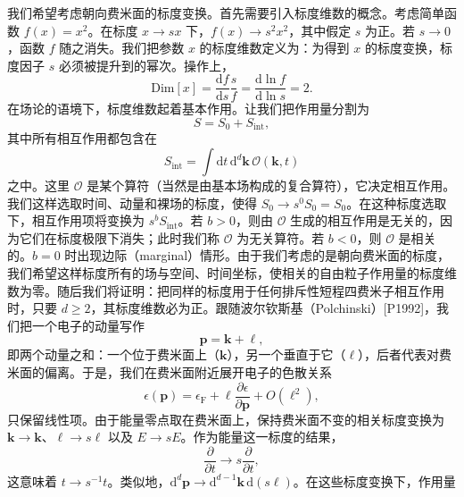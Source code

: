 我们希望考虑朝向费米面的标度变换。首先需要引入标度维数的概念。考虑简单函数 $f(x)=x^2$。在标度 $x\to sx$ 下，$f(x)\to s^2x^2$，其中假定 $s$ 为正。若 $s\to 0$，函数 $f$ 随之消失。我们把参数 $x$ 的标度维数定义为：为得到 $x$ 的标度变换，标度因子 $s$ 必须被提升到的幂次。操作上，
\begin{equation*}
\mathrm{Dim}[x]=\frac{\mathrm d f}{\mathrm d s}\frac{s}{f}=\frac{\mathrm d\ln f}{\mathrm d\ln s}=2. \tag{12.93}
\end{equation*}
在场论的语境下，标度维数起着基本作用。让我们把作用量分割为
\begin{equation*}
S=S_0+S_{\mathrm{int}}, \tag{12.94}
\end{equation*}
其中所有相互作用都包含在
\begin{equation*}
S_{\mathrm{int}}=\int\mathrm d t\,\mathrm d^d\mathbf k\,\mathcal O(\mathbf k,t) \tag{12.95}
\end{equation*}
之中。这里 $\mathcal O$ 是某个算符（当然是由基本场构成的复合算符），它决定相互作用。我们这样选取时间、动量和裸场的标度，使得 $S_0\to s^0S_0=S_0$。在这种标度选取下，相互作用项将变换为 $s^bS_{\mathrm{int}}$。若 $b>0$，则由 $\mathcal O$ 生成的相互作用是无关的，因为它们在标度极限下消失；此时我们称 $\mathcal O$ 为无关算符。若 $b<0$，则 $\mathcal O$ 是相关的。$b=0$ 时出现边际（marginal）情形。由于我们考虑的是朝向费米面的标度，我们希望这样标度所有的场与空间、时间坐标，使相关的自由粒子作用量的标度维数为零。随后我们将证明：把同样的标度用于任何排斥性短程四费米子相互作用时，只要 $d\ge 2$，其标度维数必为正。跟随波尔钦斯基（Polchinski）[P1992]，我们把一个电子的动量写作
\begin{equation*}
\mathbf p=\mathbf k+\boldsymbol\ell, \tag{12.96}
\end{equation*}
即两个动量之和：一个位于费米面上（$\mathbf k$），另一个垂直于它（$\boldsymbol\ell$），后者代表对费米面的偏离。于是，我们在费米面附近展开电子的色散关系
\begin{equation*}
\epsilon(\mathbf p)=\epsilon_{\mathrm F}+\ell\frac{\partial\epsilon}{\partial\mathbf p}+O(\ell^2), \tag{12.97}
\end{equation*}
只保留线性项。由于能量零点取在费米面上，保持费米面不变的相关标度变换为 $\mathbf k\to\mathbf k$、$\ell\to s\ell$ 以及 $E\to sE$。作为能量这一标度的结果，
\begin{equation*}
\frac{\partial}{\partial t}\to s\frac{\partial}{\partial t}, \tag{12.98}
\end{equation*}
这意味着 $t\to s^{-1}t$。类似地，$\mathrm d^d\mathbf p\to\mathrm d^{d-1}\mathbf k\,\mathrm d(s\ell)$。在这些标度变换下，作用量
